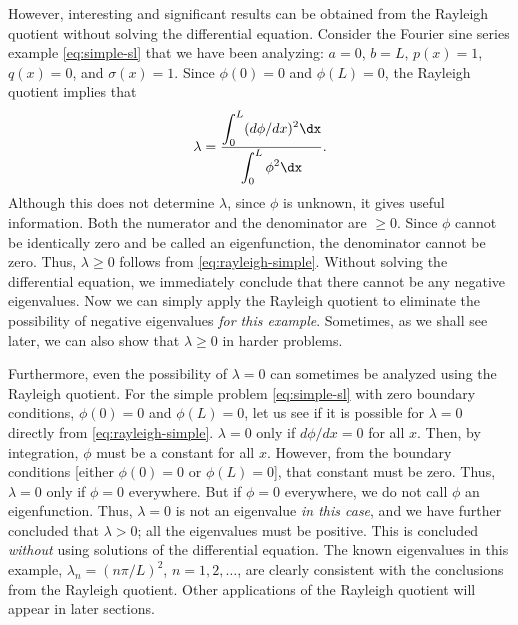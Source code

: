 However, interesting and significant results can be obtained from the Rayleigh quotient without solving the differential equation.  Consider the Fourier sine series example \eqref{eq:simple-sl} that we have been analyzing: $a = 0$, $b = L$, $p(x) = 1$, $q(x) = 0$, and $\sigma(x) = 1$.  Since $\phi(0) = 0$ and $\phi(L) = 0$, the Rayleigh quotient implies that
\begin{equation}
\label{eq:rayleigh-simple}
\lambda = \frac{\displaystyle\int_0^L (d\phi/dx)^2\dx}{\displaystyle\int_0^L \phi^2\dx}.
\end{equation}
Although this does not determine $\lambda$, since $\phi$ is unknown, it gives useful information.  Both the numerator and the denominator are $\ge 0$.  Since $\phi$ cannot be identically zero and be called an eigenfunction, the denominator cannot be zero.  Thus, $\lambda \ge 0$ follows from \eqref{eq:rayleigh-simple}.  Without solving the differential equation, we immediately conclude that there cannot be any negative eigenvalues.  Now we can simply apply the Rayleigh quotient to eliminate the possibility of negative eigenvalues \textit{for this example}.  Sometimes, as we shall see later, we can also show that $\lambda \ge 0$ in harder problems.

Furthermore, even the possibility of $\lambda = 0$ can sometimes be analyzed using the Rayleigh quotient.  For the simple problem \eqref{eq:simple-sl} with zero boundary conditions, $\phi(0) = 0$ and $\phi(L) = 0$, let us see if it is possible for $\lambda = 0$ directly from \eqref{eq:rayleigh-simple}.  $\lambda = 0$ only if $d\phi/dx = 0$ for all $x$.  Then, by integration, $\phi$ must be a constant for all $x$.  However, from the boundary conditions [either $\phi(0) = 0$ or $\phi(L) = 0$], that constant must be zero.  Thus, $\lambda = 0$ only if $\phi = 0$ everywhere.  But if $\phi = 0$ everywhere, we do not call $\phi$ an eigenfunction.  Thus, $\lambda = 0$ is not an eigenvalue \textit{in this case}, and we have further concluded that $\lambda > 0$; all the eigenvalues must be positive.  This is concluded \textit{without} using solutions of the differential equation.  The known eigenvalues in this example, $\lambda_n = (n\pi/L)^2$, $n = 1, 2, \ldots$, are clearly consistent with the conclusions from the Rayleigh quotient.  Other applications of the Rayleigh quotient will appear in later sections.

